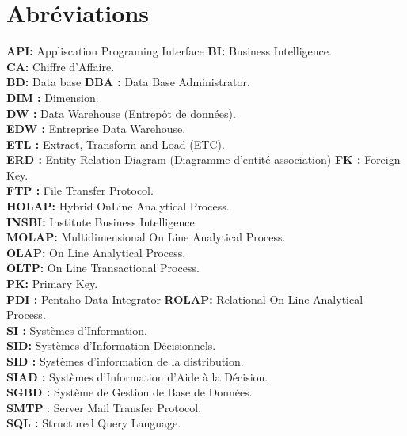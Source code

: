 \chapter{Abréviations}
\textbf{API:} Appliscation Programing Interface
\textbf{BI:} Business Intelligence.\\
\textbf{CA:} Chiffre d'Affaire. \\
\textbf{BD:} Data base
\textbf{DBA :} Data Base Administrator.\\
\textbf{DIM :} Dimension.\\
\textbf{DW :} Data Warehouse (Entrepôt de données).\\
\textbf{EDW :} Entreprise Data Warehouse.\\
\textbf{ETL :} Extract, Transform and Load (ETC).\\
\textbf{ERD :} Entity Relation Diagram (Diagramme d'entité association)
\textbf{FK :} Foreign Key.\\
\textbf{FTP :} File Transfer Protocol.\\
\textbf{HOLAP:} Hybrid OnLine Analytical Process.\\
\textbf{INSBI:} Institute Business Intelligence\\
\textbf{MOLAP:} Multidimensional On Line Analytical Process.\\
\textbf{OLAP:} On Line Analytical Process.\\
\textbf{OLTP:} On Line Transactional Process.\\
\textbf{PK:} Primary Key.\\
\textbf{PDI :} Pentaho Data Integrator
\textbf{ROLAP:} Relational On Line Analytical Process.\\
\textbf{SI :} Systèmes d’Information.\\
\textbf{SID:} Systèmes d’Information Décisionnels.\\
\textbf{SID :} Systèmes d’information de la distribution.\\
\textbf{SIAD :} Systèmes d’Information d’Aide à la Décision.\\
\textbf{SGBD :} Système de Gestion de Base de Données.\\
\textbf{SMTP }: Server Mail Transfer Protocol.\\
\textbf{SQL :} Structured Query Language.\\
